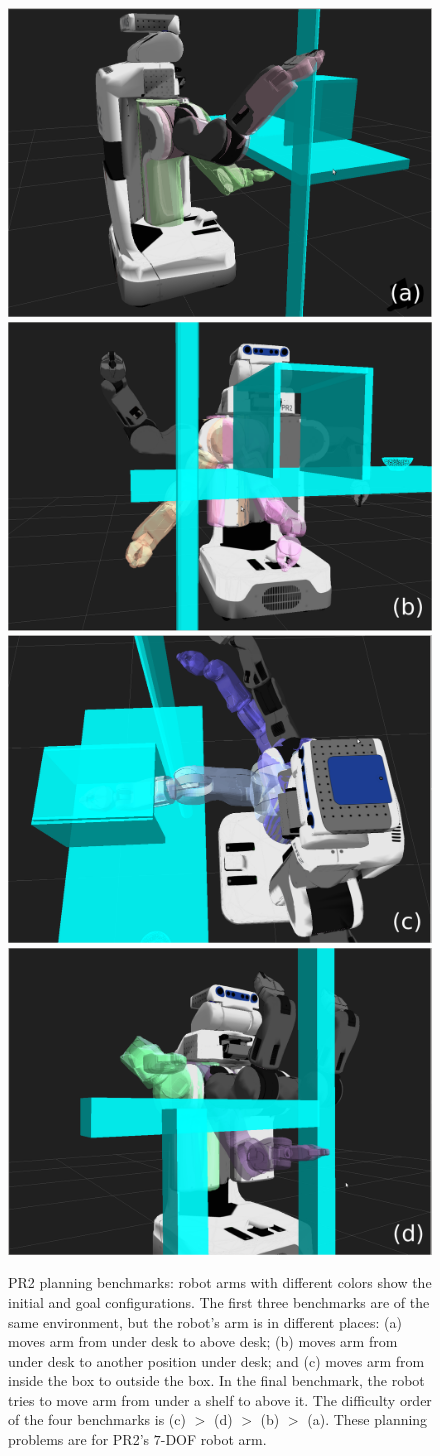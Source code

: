\begin{figure}[t]
  \centering
  \includegraphics[width=0.24\linewidth]{figs/3/benchmark1.png}
  \includegraphics[width=0.24\linewidth]{figs/3/benchmark2.png}
  \includegraphics[width=0.24\linewidth]{figs/3/benchmark3.png}
  \includegraphics[width=0.24\linewidth]{figs/3/benchmark4.png}
  \caption[PR2 planning benchmarks for instance-based learning]{\label{fig:3:benchmark} PR2 planning benchmarks: robot arms with different colors show the initial and goal configurations. The first three benchmarks are of the same environment, but the robot's arm is in different places: (a) moves arm from under desk to above desk; (b) moves arm from under desk to another position under desk; and (c) moves arm from inside the box to outside the box. In the final benchmark, the robot tries to move arm from under a shelf to above it. The difficulty order of the four benchmarks is (c) $>$ (d) $>$ (b) $>$ (a). These planning problems are for PR2's $7$-DOF robot arm.}
\end{figure}

